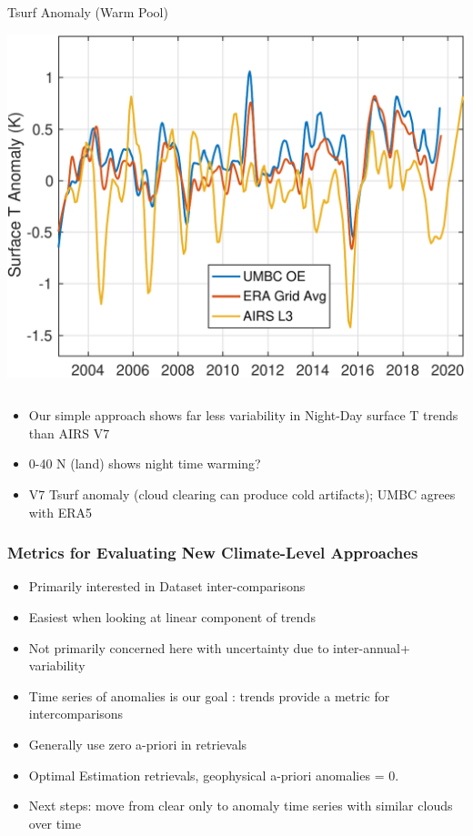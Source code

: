 \documentclass[10pt,t]{beamer}
\begin{document}
\begin{frame}
\begin{columns}
\begin{column}{0.5\columnwidth}
\begin{block}{\footnotesize Tsurf Anomaly (Warm Pool)}
\vspace{-0.05in}
\begin{center}
\includegraphics[width=\linewidth]{./Figs21/pro_tsurf_anom.pdf}
\end{center}
\end{block}
\end{column}
\end{columns}
\vspace{-0.1in}
\small
\begin{itemize}
\item Our simple approach shows far less variability in Night-Day surface T trends than AIRS V7
\item 0-40 N (land) shows night time warming?
\item V7 Tsurf anomaly (cloud clearing can produce cold artifacts); UMBC agrees with ERA5
\end{itemize}
\end{frame}
\begin{frame}
  \frametitle{Metrics for Evaluating New Climate-Level Approaches}
  \begin{itemize}
  \item Primarily interested in Dataset inter-comparisons 
  \item Easiest when looking at linear component of trends
  \item Not primarily concerned here with uncertainty due to inter-annual+ variability
  \item Time series of anomalies is our goal :  trends provide a metric for intercomparisons
  \item Generally use zero a-priori in retrievals
  \item Optimal Estimation retrievals, geophysical a-priori anomalies = 0.
  \item Next steps: move from clear only to anomaly time series with similar clouds over time
  \end{itemize}
\end{frame}
\end{document}
